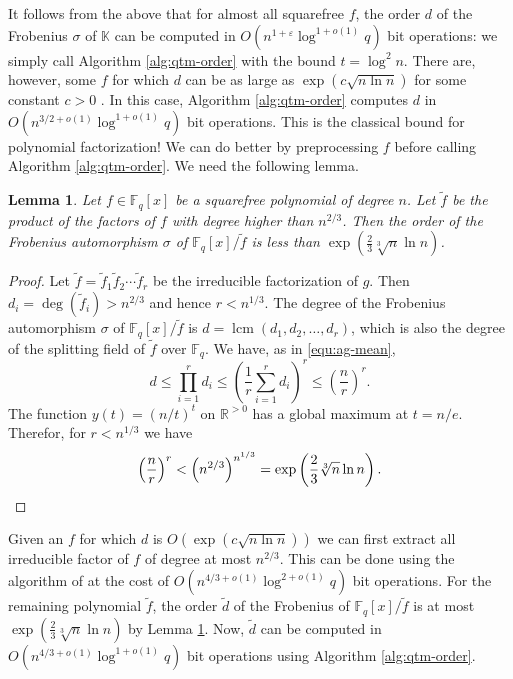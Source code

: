 \documentclass[12pt]{article}
\theoremstyle{plain}
\newtheorem{lemma}[theorem]{Lemma}
\theoremstyle{definition}
\DeclareMathOperator{\lcm}{lcm} %
\def\K{\ensuremath{\mathbb{K}}}
\def\R{\ensuremath{\mathbb{R}}}
\def\F{\ensuremath{\mathbb{F}}}
\begin{document}
It follows from the above that for almost all squarefree $f$, the order $d$ of the Frobenius 
$\sigma$ of $\K$ can be computed in $O(n^{1 + \varepsilon}\log^{1 + o(1)}q)$ bit operations: we simply 
call Algorithm \ref{alg:qtm-order} with the bound $t = \log^2n$. There are, however, some $f$ for 
which $d$ can be as large as $\exp(c\sqrt{n \ln n})$ for some constant $c > 0$  
\cite{erdos1965some}. In this case, Algorithm \ref{alg:qtm-order} computes $d$ in $O(n^{3/2 + 
o(1)}\log^{1 + o(1)}q)$ bit operations. This is the classical bound for polynomial factorization! 
We can do better by preprocessing $f$ before calling Algorithm \ref{alg:qtm-order}. We need the 
following lemma.
\begin{lemma}
\label{lem:frob-sub-ord}
	Let $f \in \F_q[x]$ be a squarefree polynomial of degree $n$. Let $\tilde{f}$ be the product of 
	the factors of $f$ with degree higher than $n^{2 / 3}$. Then the order of the Frobenius 
	automorphism $\sigma$ of $\F_q[x] / \tilde{f}$ is less than $\exp(\frac{2}{3}\sqrt[3]{n} \ln 
	n)$.
\end{lemma}
\begin{proof}
	Let $\tilde{f} = \tilde{f}_1\tilde{f}_2 \cdots \tilde{f}_r$ be the irreducible factorization of 
	$g$. Then $d_i = \deg(\tilde{f}_i) > n^{2 / 3}$ and hence $r < n^{1 / 3}$. The degree of the 
	Frobenius automorphism $\sigma$ of $\F_q[x] / \tilde{f}$ is $d = \lcm(d_1, d_2, \dots, d_r)$, 
	which is also the degree of the splitting field of $\tilde{f}$ over $\F_q$. We have, as in 
	\eqref{equ:ag-mean},
	\[ d \le \prod_{i = 1}^rd_i \le \left( \frac{1}{r} \sum_{i = 1}^rd_i \right)^r \le \left( 
	\frac{n}{r} \right)^r. \]
	The function $y(t) = (n / t)^t$ on $\R^{> 0}$ has a global maximum at $t = n / e$. Therefor, 
	for $r < n^{1/3}$ we have
	\[ \left( \frac{n}{r} \right)^r < \left( n^{2 / 3} \right)^{n^{1 / 3}} = \exp\left( \frac{2}{3} 
	\sqrt[3]{n} \ln n \right). \qedhere \]
\end{proof}
Given an $f$ for which $d$ is $O(\exp(c\sqrt{n \ln n}))$ we can first extract all irreducible 
factor of $f$ of degree at most $n^{2 / 3}$. This can be done using the algorithm of \cite[\S 
8]{kedlaya2011fast} at the cost of $O(n^{4 / 3 + o(1)}\log^{2 + o(1)}q)$ bit operations. For the 
remaining polynomial $\tilde{f}$, the order $\tilde{d}$ of the Frobenius of $\F_q[x] / \tilde{f}$ 
is at most $\exp(\frac{2}{3}\sqrt[3]{n} \ln n)$ by Lemma \ref{lem:frob-sub-ord}. Now, $\tilde{d}$ 
can be computed in $O(n^{4 / 3 + o(1)}\log^{1 + o(1)}q)$ bit operations using Algorithm 
\ref{alg:qtm-order}. 
\end{document}
